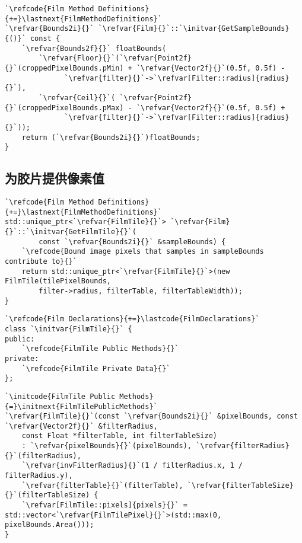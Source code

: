 \begin{lstlisting}
`\refcode{Film Method Definitions}{+=}\lastnext{FilmMethodDefinitions}`
`\refvar{Bounds2i}{}` `\refvar{Film}{}`::`\initvar{GetSampleBounds}{()}` const {
    `\refvar{Bounds2f}{}` floatBounds(
        `\refvar{Floor}{}`(`\refvar{Point2f}{}`(croppedPixelBounds.pMin) + `\refvar{Vector2f}{}`(0.5f, 0.5f) -
              `\refvar{filter}{}`->`\refvar[Filter::radius]{radius}{}`),
        `\refvar{Ceil}{}`( `\refvar{Point2f}{}`(croppedPixelBounds.pMax) - `\refvar{Vector2f}{}`(0.5f, 0.5f) +
              `\refvar{filter}{}`->`\refvar[Filter::radius]{radius}{}`));
    return (`\refvar{Bounds2i}{}`)floatBounds;
}
\end{lstlisting}

\subsection{为胶片提供像素值}\label{sub:为胶片提供像素值}
\begin{lstlisting}
`\refcode{Film Method Definitions}{+=}\lastnext{FilmMethodDefinitions}`
std::unique_ptr<`\refvar{FilmTile}{}`> `\refvar{Film}{}`::`\initvar{GetFilmTile}{}`(
        const `\refvar{Bounds2i}{}` &sampleBounds) {
    `\refcode{Bound image pixels that samples in sampleBounds contribute to}{}`
    return std::unique_ptr<`\refvar{FilmTile}{}`>(new FilmTile(tilePixelBounds,
        filter->radius, filterTable, filterTableWidth));
}
\end{lstlisting}

\begin{lstlisting}
`\refcode{Film Declarations}{+=}\lastcode{FilmDeclarations}`
class `\initvar{FilmTile}{}` {
public:
    `\refcode{FilmTile Public Methods}{}`
private:
    `\refcode{FilmTile Private Data}{}`
};
\end{lstlisting}

\begin{lstlisting}
`\initcode{FilmTile Public Methods}{=}\initnext{FilmTilePublicMethods}`
`\refvar{FilmTile}{}`(const `\refvar{Bounds2i}{}` &pixelBounds, const `\refvar{Vector2f}{}` &filterRadius,
    const Float *filterTable, int filterTableSize)
    : `\refvar{pixelBounds}{}`(pixelBounds), `\refvar{filterRadius}{}`(filterRadius),
    `\refvar{invFilterRadius}{}`(1 / filterRadius.x, 1 / filterRadius.y),
    `\refvar{filterTable}{}`(filterTable), `\refvar{filterTableSize}{}`(filterTableSize) {
    `\refvar[FilmTile::pixels]{pixels}{}` = std::vector<`\refvar{FilmTilePixel}{}`>(std::max(0, pixelBounds.Area()));
}
\end{lstlisting}

